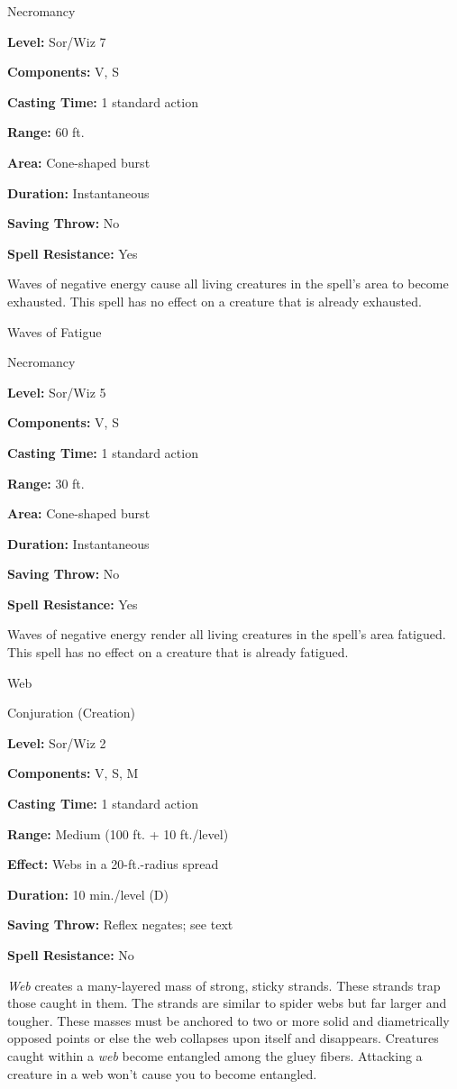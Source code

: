 \documentclass{article}
\begin{document}
Necromancy

\textbf{Level:} Sor/Wiz 7

\textbf{Components:} V, S

\textbf{Casting Time:} 1 standard action

\textbf{Range:} 60 ft.

\textbf{Area:} Cone-shaped burst

\textbf{Duration:} Instantaneous

\textbf{Saving Throw:} No

\textbf{Spell Resistance:} Yes

Waves of negative energy cause all living creatures in the spell's area to become 
exhausted. This spell has no effect on a creature that is already exhausted.

\vspace{12pt}
Waves of Fatigue

Necromancy

\textbf{Level:} Sor/Wiz 5

\textbf{Components:} V, S

\textbf{Casting Time:} 1 standard action

\textbf{Range:} 30 ft.

\textbf{Area:} Cone-shaped burst

\textbf{Duration:} Instantaneous

\textbf{Saving Throw:} No

\textbf{Spell Resistance:} Yes

Waves of negative energy render all living creatures in the spell's area fatigued. 
This spell has no effect on a creature that is already fatigued.

\vspace{12pt}
Web

Conjuration (Creation)

\textbf{Level:} Sor/Wiz 2

\textbf{Components:} V, S, M

\textbf{Casting Time:} 1 standard action

\textbf{Range: }Medium (100 ft. + 10 ft./level)

\textbf{Effect: }Webs in a 20-ft.-radius spread

\textbf{Duration:} 10 min./level (D)

\textbf{Saving Throw:} Reflex negates; see text

\textbf{Spell Resistance:} No

\textit{Web }creates a many-layered mass of strong, sticky strands. These strands 
trap those caught in them. The strands are similar to spider webs but far larger 
and tougher. These masses must be anchored to two or more solid and diametrically 
opposed points or else the web collapses upon itself and disappears. Creatures 
caught within a \textit{web }become entangled among the gluey fibers. Attacking 
a creature in a web won't cause you to become entangled.
\end{document}
